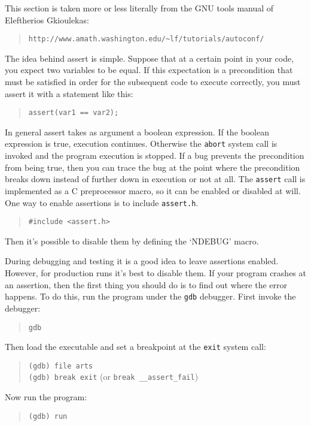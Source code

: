  \label{sec:development:assert}

This section is taken more or less literally from the GNU tools manual
of Eleftherios Gkioulekas:
\begin{quote}
{\footnotesize
\verb|http://www.amath.washington.edu/~lf/tutorials/autoconf/|}
\end{quote}

The idea behind assert is simple. Suppose that at a certain point in
your code, you expect two variables to be equal.  If this expectation
is a precondition that must be satisfied in order for the subsequent
code to execute correctly, you must assert it with a statement like
this:
\begin{quote}
\verb|assert(var1 == var2);|
\end{quote}

In general assert takes as argument a boolean expression. If the
boolean expression is true, execution continues. Otherwise the
\verb|abort| system call is invoked and the program execution is
stopped. If a bug prevents the precondition from being true, then you
can trace the bug at the point where the precondition breaks down
instead of further down in execution or not at all.  The \verb|assert| call
is implemented as a C preprocessor macro, so it can be enabled or
disabled at will. One way to enable assertions is to include
\verb|assert.h|.
\begin{quote}
  \verb|#include <assert.h>|
\end{quote}
Then it's possible to disable them by defining the `NDEBUG' macro.

%
%

During debugging and testing it is a good idea to leave assertions
enabled. However, for production runs it's best to disable them. If
your program crashes at an assertion, then the first thing you should
do is to find out where the error happens. To do this, run the program
under the \verb|gdb| debugger. First invoke the debugger:
\begin{quote}
\verb|gdb|
\end{quote}
Then load the executable and set a breakpoint at the \verb|exit|
system call:
\begin{quote}
  \verb|(gdb) file arts|\\
  \verb|(gdb) break exit| (or \verb|break __assert_fail|)
\end{quote}
Now run the program: 
\begin{quote}
  \verb|(gdb) run|
\end{quote}

